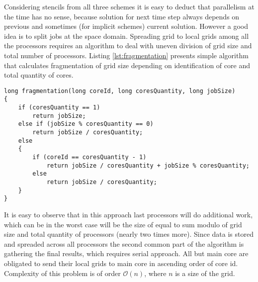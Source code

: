 	Considering \gls{stencil}s from all three schemes it is easy to deduct that parallelism at the time has no sense, because solution for next time step always depends on previous and sometimes (for implicit schemes) current solution. However a good idea is to split jobs at the space domain. Spreading grid to local grids among all the processors requires an algorithm to deal with uneven division of grid size and total number of processors. Listing \ref{lst:fragmentation} presents simple algorithm that calculates fragmentation of grid size depending on identification of core and total quantity of cores.
	\begin{lstlisting}[caption=Grid fragmentation algorithm written in C++., label=lst:fragmentation] 
long fragmentation(long coreId, long coresQuantity, long jobSize)
{
	if (coresQuantity == 1)
		return jobSize;
	else if (jobSize % coresQuantity == 0)
		return jobSize / coresQuantity;
	else
	{
		if (coreId == coresQuantity - 1)
			return jobSize / coresQuantity + jobSize % coresQuantity;
		else
			return jobSize / coresQuantity;
	}
}
	\end{lstlisting} 
	It is easy to observe that in this approach last processors will do additional work, which can be in the worst case will be the size of equal to sum modulo of grid size and total quantity of processors (nearly two times more). Since data is stored and spreaded across all processors the second common part of the algorithm is gathering the final results, which requires serial approach. All but main core are obligated to send their local grids to main core in ascending order of core id. Complexity of this problem is of order $\mathcal{O}(n)$, where $n$ is a size of the grid.
	
	
	
	
	\clearpage